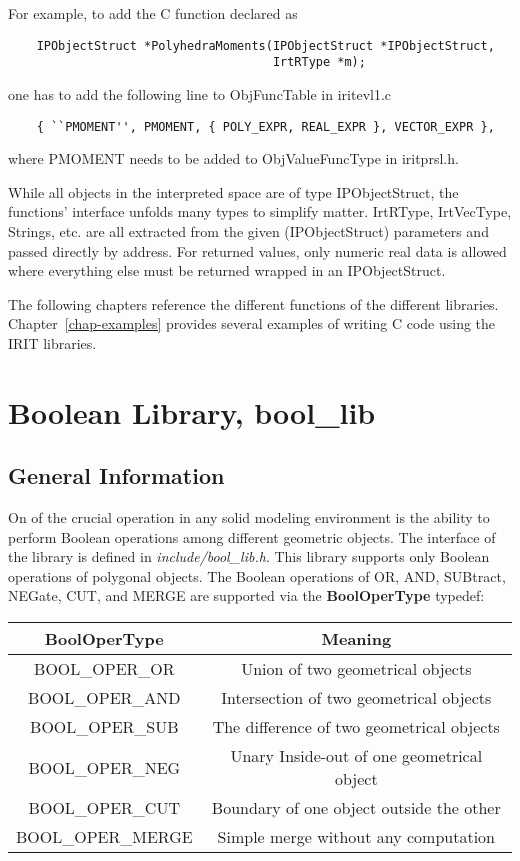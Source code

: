 For example, to add the C function declared as
\begin{verbatim}
    IPObjectStruct *PolyhedraMoments(IPObjectStruct *IPObjectStruct,
                                     IrtRType *m);
\end{verbatim}
one has to add the following line to ObjFuncTable in iritevl1.c
\begin{verbatim}
    { ``PMOMENT'', PMOMENT, { POLY_EXPR, REAL_EXPR }, VECTOR_EXPR },
\end{verbatim}
where PMOMENT needs to be added to ObjValueFuncType in iritprsl.h.

While all objects in the interpreted space are of type IPObjectStruct,
the functions' interface unfolds many types to simplify matter.
IrtRType, IrtVecType, Strings, etc. are all extracted from the given
(IPObjectStruct) parameters and passed directly by address.  For
returned values, only numeric real data is allowed where everything
else must be returned wrapped in an IPObjectStruct.


The following chapters reference the different functions of the different
libraries. Chapter~\ref{chap-examples} provides several examples of
writing C code using the IRIT libraries.

\chapter{Boolean Library, bool\_lib}

\section{General Information}

On of the crucial operation in any solid modeling environment is the
ability to perform Boolean operations among different geometric
objects.  The interface of the library is defined in {\em
include/bool\_lib.h}. This library supports only Boolean operations of
polygonal objects. The Boolean operations of OR, AND, SUBtract,
NEGate, CUT, and MERGE are supported via the {\bf BoolOperType}
typedef:
\begin{center}
\begin{tabular}{||c|c||} \hline 
    BoolOperType & Meaning \\ \hline
    BOOL\_OPER\_OR & Union of two geometrical objects \\
    BOOL\_OPER\_AND & Intersection of two geometrical objects \\
    BOOL\_OPER\_SUB & The difference of two geometrical objects \\
    BOOL\_OPER\_NEG & Unary Inside-out of one geometrical object \\
    BOOL\_OPER\_CUT & Boundary of one object outside the other \\
    BOOL\_OPER\_MERGE & Simple merge without any computation \\ \hline
\end{tabular}
\end{center}

